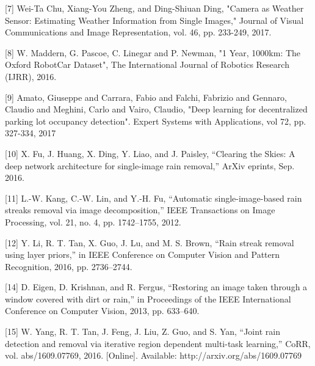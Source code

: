 \documentclass{article}
\begin{document}
\label{[7]}[7] Wei-Ta Chu, Xiang-You Zheng, and Ding-Shiuan Ding, "Camera as Weather Sensor: Estimating Weather Information from Single Images," Journal of Visual Communications and Image Representation, vol. 46, pp. 233-249, 2017.

\label{[8]}[8] W. Maddern, G. Pascoe, C. Linegar and P. Newman, "1 Year, 1000km: The Oxford RobotCar Dataset", The International Journal of Robotics Research (IJRR), 2016.

\label{[9]}[9] Amato, Giuseppe and Carrara, Fabio and Falchi, Fabrizio and Gennaro, Claudio and Meghini, Carlo and Vairo, Claudio, "Deep learning for decentralized parking lot occupancy detection". Expert Systems with Applications, vol 72, pp. 327-334, 2017

\label{[10]}[10] X. Fu, J. Huang, X. Ding, Y. Liao, and J. Paisley, “Clearing the Skies: A deep network architecture for single-image rain removal,” ArXiv eprints, Sep. 2016.

\label{[11]}[11] L.-W. Kang, C.-W. Lin, and Y.-H. Fu, “Automatic single-image-based rain streaks removal via image decomposition,” IEEE Transactions on Image Processing, vol. 21, no. 4, pp. 1742–1755, 2012.

\label{[12]}[12] Y. Li, R. T. Tan, X. Guo, J. Lu, and M. S. Brown, “Rain streak removal using layer priors,” in IEEE Conference on Computer Vision and Pattern Recognition, 2016, pp. 2736–2744.

\label{[14]}[14] D. Eigen, D. Krishnan, and R. Fergus, “Restoring an image taken through a window covered with dirt or rain,” in Proceedings of the IEEE International Conference on Computer Vision, 2013, pp. 633–640.

\label{[15]}[15] W. Yang, R. T. Tan, J. Feng, J. Liu, Z. Guo, and S. Yan, “Joint rain detection and removal via iterative region dependent multi-task learning,” CoRR, vol. abs/1609.07769, 2016. [Online]. Available: http://arxiv.org/abs/1609.07769
\end{document}
